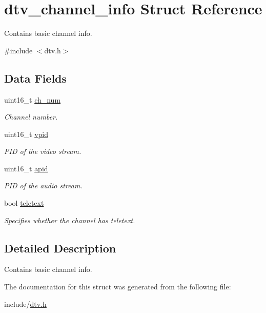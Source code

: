 \hypertarget{structdtv__channel__info}{}\section{dtv\+\_\+channel\+\_\+info Struct Reference}
\label{structdtv__channel__info}


Contains basic channel info.  




{\ttfamily \#include $<$dtv.\+h$>$}

\subsection*{Data Fields}
\begin{DoxyCompactItemize}
\item 
uint16\+\_\+t \hyperlink{structdtv__channel__info_ab6fa202ab5597749ab9ab84ac7cc9070}{ch\+\_\+num}\hypertarget{structdtv__channel__info_ab6fa202ab5597749ab9ab84ac7cc9070}{}\label{structdtv__channel__info_ab6fa202ab5597749ab9ab84ac7cc9070}

\begin{DoxyCompactList}\small\item\em Channel number. \end{DoxyCompactList}\item 
uint16\+\_\+t \hyperlink{structdtv__channel__info_ab9c86f2f2bad52a12473b0270e800ce4}{vpid}\hypertarget{structdtv__channel__info_ab9c86f2f2bad52a12473b0270e800ce4}{}\label{structdtv__channel__info_ab9c86f2f2bad52a12473b0270e800ce4}

\begin{DoxyCompactList}\small\item\em P\+ID of the video stream. \end{DoxyCompactList}\item 
uint16\+\_\+t \hyperlink{structdtv__channel__info_aef2aa5f90eda92d84007715585e031be}{apid}\hypertarget{structdtv__channel__info_aef2aa5f90eda92d84007715585e031be}{}\label{structdtv__channel__info_aef2aa5f90eda92d84007715585e031be}

\begin{DoxyCompactList}\small\item\em P\+ID of the audio stream. \end{DoxyCompactList}\item 
bool \hyperlink{structdtv__channel__info_a1dad32ba0ccc0f1a9a953a1be5d7c470}{teletext}\hypertarget{structdtv__channel__info_a1dad32ba0ccc0f1a9a953a1be5d7c470}{}\label{structdtv__channel__info_a1dad32ba0ccc0f1a9a953a1be5d7c470}

\begin{DoxyCompactList}\small\item\em Specifies whether the channel has teletext. \end{DoxyCompactList}\end{DoxyCompactItemize}


\subsection{Detailed Description}
Contains basic channel info. 

The documentation for this struct was generated from the following file\+:\begin{DoxyCompactItemize}
\item 
include/\hyperlink{dtv_8h}{dtv.\+h}\end{DoxyCompactItemize}
